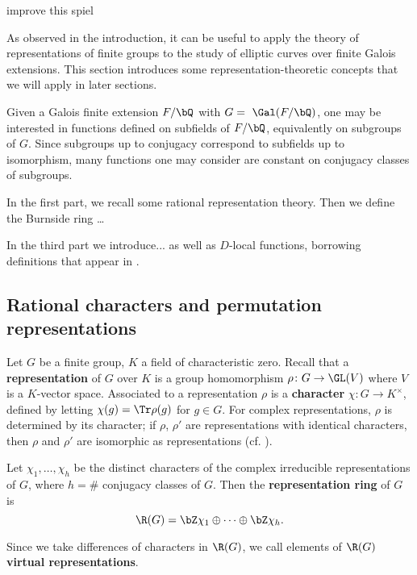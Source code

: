 {\color{red} improve this spiel}

As observed in the introduction, it can be useful to apply the theory of representations of finite groups to the study of elliptic curves over finite Galois extensions. This section introduces some representation-theoretic concepts that we will apply in later sections. 

Given a Galois finite extension $F / \bQ$ with $G = \ \Gal(F / \bQ)$, one may be interested in functions defined on subfields of $F / \bQ$, equivalently on subgroups of $G$. Since subgroups up to conjugacy correspond to subfields up to isomorphism, many functions one may consider are constant on conjugacy classes of subgroups. 

In the first part, we recall some rational representation theory. Then we define the Burnside ring{\color{red} \ldots}

In the third part we introduce... as well as $D$-local functions, borrowing definitions that appear in \cite[Section 2.iii]{reg-const}.

\subsection{Rational characters and permutation representations}\label{rep}

Let $G$ be a finite group, $K$ a field of characteristic zero. Recall that a \textbf{representation} of $G$ over $K$ is a group homomorphism $\rho \colon G \to \GL(V)$ where $V$ is a $K$-vector space. Associated to a representation $\rho$ is a \textbf{character} $\chi \colon G \to K^{\times}$, defined by letting $\chi(g) = \Tr \rho(g)$ for $g \in G$. For complex representations, $\rho$ is determined by its character; if $\rho$, $\rho'$ are representations with identical characters, then $\rho$ and $\rho'$ are isomorphic as representations (cf. \cite[Chapter 2, \S 2.3]{Serre}). 

\begin{defn}\label{rep-ring}
Let $\chi_1, \ldots,  \chi_h$ be the distinct characters of the complex irreducible representations of $G$, where $h = \#$ conjugacy classes of $G$. 
Then the \textbf{representation ring} of $G$ is 
\[ \R(G) = \bZ \chi_1 \oplus \cdots \oplus \bZ \chi_h .\]
\end{defn}

Since we take differences of characters in $\R(G)$, we call elements of $\R(G)$ \textbf{virtual representations}. 

